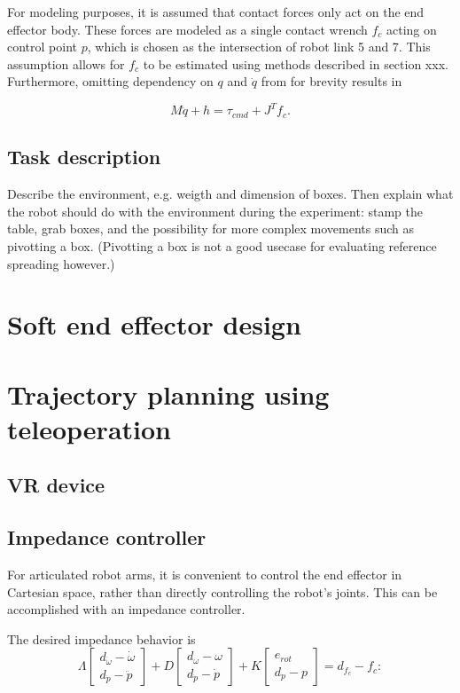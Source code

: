 \documentclass[a4paper, 10pt, conference]{ieeeconf}
\begin{document}
    For modeling purposes, it is assumed that contact forces only act on the end effector body. These forces are modeled as a single contact wrench $f_c$ acting on control point $p$, which is chosen as the intersection of robot link 5 and 7. This assumption allows for $f_c$ to be estimated using methods described in section xxx. Furthermore, omitting dependency on $q$ and $\dot{q}$ from for brevity results in

    \begin{equation}
    M\ddot{q}+h=\tau_{cmd}+J^Tf_c.
    \end{equation}

\subsection{Task description}
Describe the environment, e.g. weigth and dimension of boxes. Then explain what the robot should do with the environment during the experiment: stamp the table, grab boxes, and the possibility for more complex movements such as pivotting a box. (Pivotting a box is not a good usecase for evaluating reference spreading however.)
    \section{Soft end effector design}
    \section{Trajectory planning using teleoperation}
    \subsection{VR device}
    \subsection{Impedance controller}
    For articulated robot arms, it is convenient to control the end effector in Cartesian space, rather than directly controlling the robot's joints. This can be accomplished with an impedance controller.

    The desired impedance behavior is
    \begin{equation} \label{eq:impedance_desired}
     \Lambda  \begin{bmatrix} d_{\dot{\omega}} - \dot{\omega}   \\ d_{\ddot{p}} - \ddot{p}  \end{bmatrix} + D \begin{bmatrix}d_\omega - {\omega} \\ d_{\dot{p}} - \dot{p} \end{bmatrix}  + K \begin{bmatrix} e_{rot} \\d_p - {p}  \end{bmatrix} = d_{f_c} -f_c:
     \end{equation} 
\end{document}
